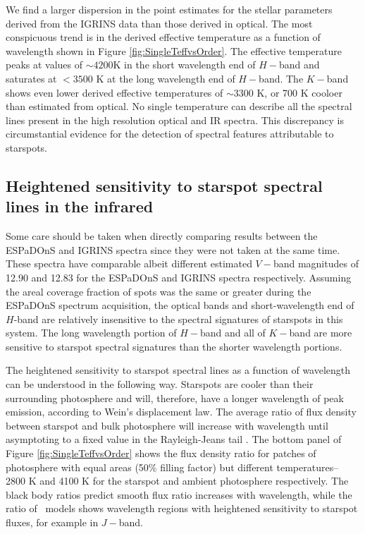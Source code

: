 \documentclass[twocolumn]{emulateapj}%
\begin{document}
We find a larger dispersion in the point estimates for the stellar parameters derived from the IGRINS data than those derived in optical.  The most conspicuous trend is in the derived effective temperature as a function of wavelength shown in Figure \ref{fig:SingleTeffvsOrder}.  The effective temperature peaks at values of $\sim4200$K in the short wavelength end of $H-$band and saturates at $<3500$ K at the long wavelength end of $H-$band.  The $K-$band shows even lower derived effective temperatures of $\sim3300$ K, or 700 K cooloer than estimated from optical.  No single temperature can describe all the spectral lines present in the high resolution optical and IR spectra.  This discrepancy is circumstantial evidence for the detection of spectral features attributable to starspots.  


\subsection{Heightened sensitivity to starspot spectral lines in the infrared}\label{sec:whyNearIR}

Some care should be taken when directly comparing results between the ESPaDOnS and IGRINS spectra since they were not taken at the same time.  These spectra have comparable albeit different estimated $V-$band magnitudes of 12.90 and 12.83 for the ESPaDOnS and IGRINS spectra respectively.  Assuming the areal coverage fraction of spots was the same or greater during the ESPaDOnS spectrum acquisition, the optical bands and short-wavelength end of $H$-band are relatively insensitive to the spectral signatures of starspots in this system.  The long wavelength portion of $H-$band and all of $K-$band are more sensitive to starspot spectral signatures than the shorter wavelength portions.

The heightened sensitivity to starspot spectral lines as a function of wavelength can be understood in the following way.  Starspots are cooler than their surrounding photosphere and will, therefore, have a longer wavelength of peak emission, according to Wein's displacement law.  The average ratio of flux density between starspot and bulk photosphere will increase with wavelength until asymptoting to a fixed value in the Rayleigh-Jeans tail \citep{wolk96}.  The bottom panel of Figure \ref{fig:SingleTeffvsOrder} shows the flux density ratio for patches of photosphere with equal areas (50\% filling factor) but different temperatures-- 2800 K and 4100 K for the starspot and ambient photosphere respectively.  The black body ratios predict smooth flux ratio increases with wavelength, while the ratio of \PHOENIX\ models shows wavelength regions with heightened sensitivity to starspot fluxes, for example in $J-$band.
\end{document}
